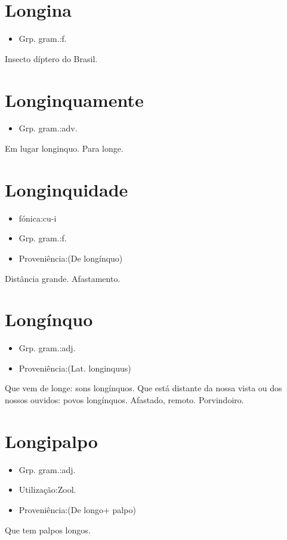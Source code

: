 \section{Longina}
\begin{itemize}
\item {Grp. gram.:f.}
\end{itemize}
Insecto díptero do Brasil.
\section{Longinquamente}
\begin{itemize}
\item {Grp. gram.:adv.}
\end{itemize}
Em lugar longinquo.
Para longe.
\section{Longinquidade}
\begin{itemize}
\item {fónica:cu-i}
\end{itemize}
\begin{itemize}
\item {Grp. gram.:f.}
\end{itemize}
\begin{itemize}
\item {Proveniência:(De \textunderscore longínquo\textunderscore )}
\end{itemize}
Distância grande.
Afastamento.
\section{Longínquo}
\begin{itemize}
\item {Grp. gram.:adj.}
\end{itemize}
\begin{itemize}
\item {Proveniência:(Lat. \textunderscore longinquus\textunderscore )}
\end{itemize}
Que vem de longe: \textunderscore sons longínquos\textunderscore .
Que está distante da nossa vista ou dos nossos ouvidos: \textunderscore povos longínquos\textunderscore .
Afastado, remoto.
Porvindoiro.
\section{Longipalpo}
\begin{itemize}
\item {Grp. gram.:adj.}
\end{itemize}
\begin{itemize}
\item {Utilização:Zool.}
\end{itemize}
\begin{itemize}
\item {Proveniência:(De \textunderscore longo\textunderscore  + \textunderscore palpo\textunderscore )}
\end{itemize}
Que tem palpos longos.
